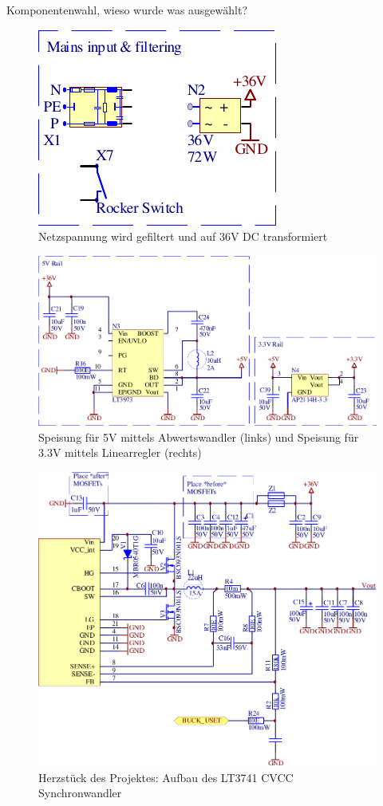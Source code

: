 Komponentenwahl, wieso wurde was ausgew\"ahlt?

\begin{figure}[H]
    \center
    \includegraphics[width=.35\textwidth]{images/circuit/mains-input.pdf}
    \caption{Netzspannung wird gefiltert und auf 36V DC transformiert}
    \label{fig:circuit:mains-input}
\end{figure}

\begin{figure}[H]
    \center
    \includegraphics[width=.75\textwidth]{images/circuit/5v-3v-rails.pdf}
    \caption{Speisung f\"ur 5V mittels Abwertswandler (links) und Speisung f\"ur 3.3V mittels Linearregler (rechts)}
    \label{fig:circuit:rails}
\end{figure}

\begin{figure}[H]
    \center
    \includegraphics[width=.75\textwidth]{images/circuit/buck.pdf}
    \caption{Herzst\"uck des Projektes: Aufbau des LT3741 CVCC Synchronwandler}
    \label{fig:circuit:buck}
\end{figure}

